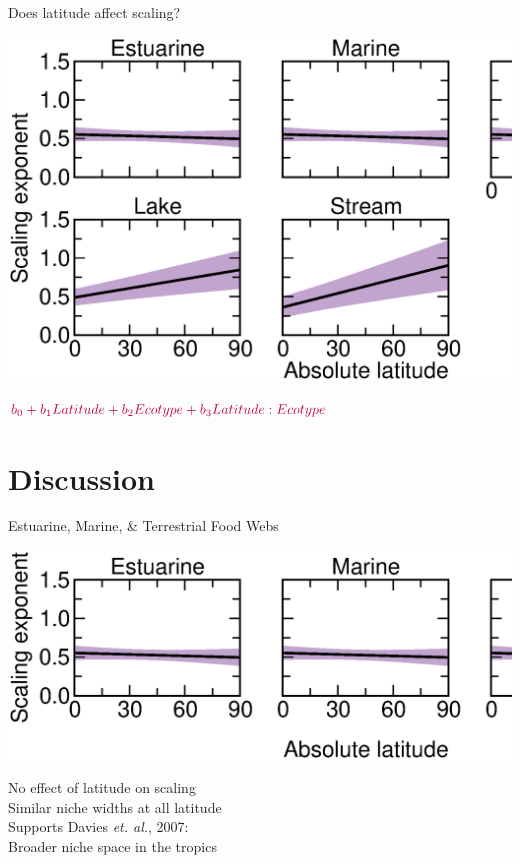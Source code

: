 \documentclass{beamer}
\begin{document}
  \begin{frame}{Does latitude affect scaling?}
    \begin{center}
      \includegraphics*[width=.9\textwidth]{Figures/results/Gen_vs_S_marginal.eps}

      \vspace{.8cm}
      ${\color{purple}b_0+b_1Latitude+b_2Ecotype+b_3Latitude:Ecotype}$

    \end{center}
  \end{frame}

\section*{Discussion}

  \begin{frame}{Estuarine, Marine, \& Terrestrial Food Webs}
    \begin{center}
      \includegraphics*[width=.9\textwidth]{Figures/results/no_effect.eps}

      \vspace{1cm}
      {\color{white} No effect of latitude on scaling\\
      Similar niche widths at all latitude\\
      \vspace{.54cm}        
      Supports Davies \emph{et. al.}, 2007:\\
      Broader niche space in the tropics}

    \end{center}
  \end{frame}
\end{document}
